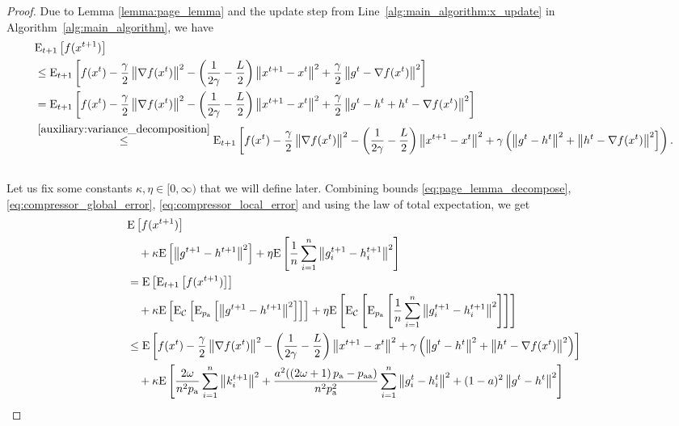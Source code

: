 \documentclass{article}
\newcommand*{\probavailable}{\ensuremath{p_{\textnormal{a}}}}
\newcommand*{\probpairaa}{\ensuremath{p_{\textnormal{aa}}}}
\begin{document}
\begin{proof}
  Due to Lemma \ref{lemma:page_lemma} and the update step from Line~\ref{alg:main_algorithm:x_update} in Algorithm~\ref{alg:main_algorithm}, we have
  \begin{align}
    &{\rm E}_{t+1}\left[f(x^{t + 1})\right] \\
    &\leq {\rm E}_{t+1}\left[f(x^t) - \frac{\gamma}{2}\left\| \nabla f(x^t) \right\|^2 - \left(\frac{1}{2\gamma} - \frac{L}{2}\right)
      \left\| x^{t+1} - x^t \right\|^2 + \frac{\gamma}{2}\left\| g^{t} - \nabla f(x^t) \right\|^2\right] \nonumber \\
      &= {\rm E}_{t+1}\left[f(x^t) - \frac{\gamma}{2}\left\| \nabla f(x^t) \right\|^2 - \left(\frac{1}{2\gamma} - \frac{L}{2}\right)
      \left\| x^{t+1} - x^t \right\|^2 + \frac{\gamma}{2}\left\| g^{t} - h^t + h^t - \nabla f(x^t) \right\|^2\right] \label{eq:page_lemma_decompose} \\
      &\overset{\eqref{auxiliary:variance_decomposition}}{\leq} {\rm E}_{t+1}\left[f(x^t) - \frac{\gamma}{2}\left\| \nabla f(x^t) \right\|^2 - \left(\frac{1}{2\gamma} - \frac{L}{2}\right)
      \left\| x^{t+1} - x^t \right\|^2 + \gamma\left(\left\| g^{t} - h^t \right\|^2 + \left\| h^t - \nabla f(x^t) \right\|^2\right]\right). \nonumber \\
      \nonumber
  \end{align}
  Let us fix some constants $\kappa, \eta \in [0,\infty)$ that we will define later. Combining bounds \eqref{eq:page_lemma_decompose}, \eqref{eq:compressor_global_error}, \eqref{eq:compressor_local_error} and using the law of total expectation, we get
  \begin{align*}
      &\Exp{f(x^{t + 1})} \nonumber \\
      &\quad  + \kappa \Exp{\norm{g^{t+1} - h^{t+1}}^2} + \eta \Exp{\frac{1}{n}\sum_{i=1}^n\norm{g^{t+1}_i - h^{t+1}_i}^2} \nonumber\\
      &=\Exp{\ExpSub{t+1}{f(x^{t + 1})}} \nonumber \\
      &\quad  + \kappa \Exp{\ExpSub{\cC}{\ExpSub{\probavailable}{\norm{g^{t+1} - h^{t+1}}^2}}} + \eta \Exp{\ExpSub{\cC}{\ExpSub{\probavailable}{\frac{1}{n}\sum_{i=1}^n\norm{g^{t+1}_i - h^{t+1}_i}^2}}} \nonumber\\
      &\leq \Exp{f(x^t) - \frac{\gamma}{2}\norm{\nabla f(x^t)}^2 - \left(\frac{1}{2\gamma} - \frac{L}{2}\right)
      \norm{x^{t+1} - x^t}^2 + \gamma\left(\norm{g^{t} - h^t}^2 + \norm{h^{t} - \nabla f(x^t)}^2\right)} \nonumber\\
      &\quad +\kappa \Exp{\frac{2 \omega}{n^2 \probavailable}\sum_{i=1}^n\norm{k^{t+1}_i}^2 +\frac{a^2 (\left(2 \omega + 1\right)\probavailable - \probpairaa)}{n^2 \probavailable^2}\sum_{i=1}^n\norm{g^{t}_i - h^{t}_i}^2 + (1 - a)^2\norm{g^{t} - h^{t}}^2} \nonumber\\

\end{align*}
\end{proof}
\end{document}
